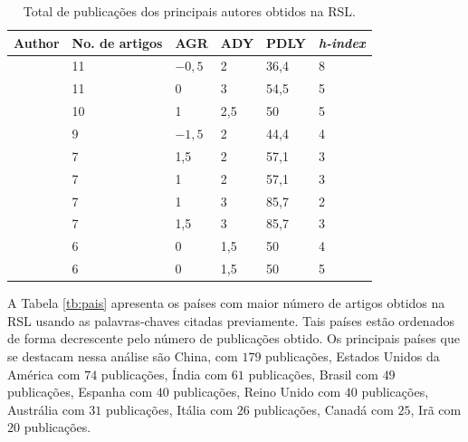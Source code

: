 \begin{table}[!htb]
	\centering
	\caption{Total de publicações dos principais autores obtidos na RSL.}\label{tb:autor}
	\begin{tabular}{llllll}
		\hline
		Author & No. de artigos & AGR & ADY & PDLY & \textit{h-index} \\
		\hline
		\citeonline{2-s2.0-84973369468} & 11 & $-0,5$ & 2 & 36,4 & 8 \\
		\citeonline{2-s2.0-85123707840} & 11 & 0 & 3 & 54,5 & 5 \\
		\citeonline{2-s2.0-85018469706} & 10 & 1 & 2,5 & 50 & 5 \\
		\citeonline{2-s2.0-85048003524} & 9 & $-1,5$ & 2 & 44,4 & 4 \\
		\citeonline{2-s2.0-84964575877} & 7 & 1,5 & 2 & 57,1 & 3 \\
		\citeonline{2-s2.0-85063200888} & 7 & 1 & 2 & 57,1 & 3 \\
		\citeonline{2-s2.0-85148656225} & 7 & 1 & 3 & 85,7 & 2 \\
		\citeonline{2-s2.0-85041536076} & 7 & 1,5 & 3 & 85,7 & 3 \\
		\citeonline{2-s2.0-85130875471} & 6 & 0 & 1,5 & 50 & 4 \\
		\citeonline{2-s2.0-85061810603} & 6 & 0 & 1,5 & 50 & 5 \\
		\hline
	\end{tabular}
\end{table}



A Tabela \ref{tb:pais} apresenta os países com maior número de artigos obtidos na RSL usando as palavras-chaves citadas previamente. Tais países estão ordenados de forma decrescente pelo número de publicações obtido. Os principais países que se destacam nessa análise são China, com $179$ publicações, Estados Unidos da América com $74$ publicações, Índia com $61$ publicações, Brasil com $49$ publicações, Espanha com $40$ publicações, Reino Unido com $40$ publicações, Austrália com $31$ publicações, Itália com $26$ publicações, Canadá com $25$, Irã com $20$ publicações.

